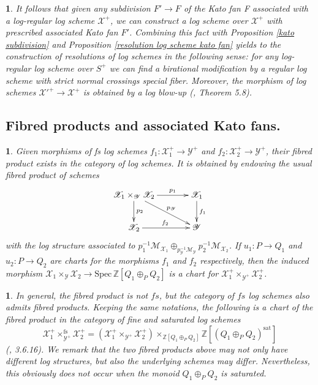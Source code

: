\documentclass{amsart}%
\numberwithin{equation}{subsection}
\theoremstyle{plain2}
\theoremstyle{definition2}
\theoremstyle{stepstyle}
\theoremstyle{point}
\theoremstyle{subpoint}
\newtheorem{subpoint}[equation]{}%
\newcommand{\spa}[1]{\begin{subpoint}#1\end{subpoint}}           %
\newcommand{\Z}{\ensuremath{\mathbb{Z}}}
\newcommand{\cX}{\ensuremath{\mathscr{X}}}
\newcommand{\caM}{\ensuremath{\mathcal{M}}}
\newcommand{\cY}{\ensuremath{\mathscr{Y}}}
\renewcommand{\cY}{\ensuremath{\mathscr{Y}}}
\newcommand{\Spec}{\ensuremath{\mathrm{Spec}\,}}
\begin{document}
\spa{\label{rem resolution via subd}
It follows that given any subdivision $F' \rightarrow F$ of the Kato fan F associated with a log-regular log scheme $\cX^+$, we can construct a log scheme over $\cX^+$ with prescribed associated Kato fan $F'$. Combining this fact with Proposition \ref{kato subdivision} and Proposition \ref{resolution log scheme kato fan} yields to the construction of resolutions of log schemes in the following sense: for any log-regular log scheme over $S^+$ we can find a birational modification by a regular log scheme with strict normal crossings special fiber. Moreover, the morphism of log schemes ${\cX'}^+ \rightarrow \cX^+$ is obtained by a log blow-up  (\cite{Niziol2006}, Theorem 5.8).} 


\subsection {Fibred products and associated Kato fans.}\label{sect fs product}
\spa{Given morphisms of \emph{fs} log schemes $f_1: \cX_1^+ \rightarrow \cY^+$ and $f_2: \cX_2^+ \rightarrow \cY^+$, their fibred product exists in the category of log schemes. It is obtained by endowing the usual fibred product of schemes
\begin{equation} \label{fibred product diagram}
\begin{gathered}
\xymatrixcolsep{3pc} \xymatrix{
  \cX_1\times_{\cY} \cX_2 \ar[r]^-{p_1} \ar[dr]^-{p_{\cY}} \ar[d]^-{p_2} & \cX_1 \ar[d]^{f_1}\\
  \cX_2 \ar[r]^{f_2}   & \cY
}
\end{gathered}
\end{equation}
with the log structure associated to $p_1^{-1}\caM_{\cX_1} \oplus_{p_{\cY}^{-1}\caM_{\cY}} p_2^{-1}\caM_{\cX_2}$. If $u_1:P \rightarrow Q_1$ and $u_2:P \rightarrow Q_2$ are charts for the morphisms $f_1$ and $f_2$ respectively, then the induced morphism $\cX_1\times_{\cY} \cX_2 \rightarrow \Spec \Z[Q_1 \oplus_P Q_2]$ is a chart for $\cX_1^+\times_{\cY^+} \cX_2^+$. }

\spa{In general, the fibred product is not $fs$, but the category of $fs$ log schemes also admits fibred products. Keeping the same notations, the following is a chart of the fibred product in the category of fine and saturated log schemes $$\cX_1^+\times_{\cY^+}^{\text{fs}} \cX_2^+ = (\cX_1^+\times_{\cY^+} \cX_2^+) \times_{\Z[Q_1 \oplus_P Q_2]} \Z[(Q_1 \oplus_P Q_2)^{\text{sat}}]$$(\cite{Bultot2015}, 3.6.16). We remark that the two fibred products above may not only have different log structures, but also the underlying schemes may differ. Nevertheless, this obviously does not occur when the monoid $Q_1 \oplus_P Q_2$ is saturated.}
\end{document}

